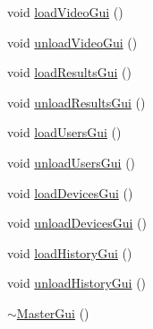 \begin{DoxyCompactItemize}
\item 
void \hyperlink{class_master_gui_aad475ba377d712fb3f3159b35a44dcd5}{load\-Video\-Gui} ()
\item 
void \hyperlink{class_master_gui_ad1e812ae66f5e22e243af122576d7a54}{unload\-Video\-Gui} ()
\item 
void \hyperlink{class_master_gui_a269c64be1b91cf8fd9b514e14ef0f61c}{load\-Results\-Gui} ()
\item 
void \hyperlink{class_master_gui_ae528dcddc5c9cacfb2da4ed2fd73c918}{unload\-Results\-Gui} ()
\item 
void \hyperlink{class_master_gui_a1f18335831f755fa60cc7b2dfbb5f6f6}{load\-Users\-Gui} ()
\item 
void \hyperlink{class_master_gui_af822ec52a33f23f476684714aacd9a4c}{unload\-Users\-Gui} ()
\item 
void \hyperlink{class_master_gui_a9477c85af4420ec5c8d0c5ceeb4df9de}{load\-Devices\-Gui} ()
\item 
void \hyperlink{class_master_gui_abeb5b8861736263521757754dff9d5d9}{unload\-Devices\-Gui} ()
\item 
void \hyperlink{class_master_gui_aae738557e6153a8584468f8af3a5f2d8}{load\-History\-Gui} ()
\item 
void \hyperlink{class_master_gui_a0e0b8c7b714b89df916742664f7c338b}{unload\-History\-Gui} ()
\item 
\hyperlink{class_master_gui_a4eeae08177c54aba4aad160fc1c5efc6}{$\sim$\-Master\-Gui} ()
\end{DoxyCompactItemize}
